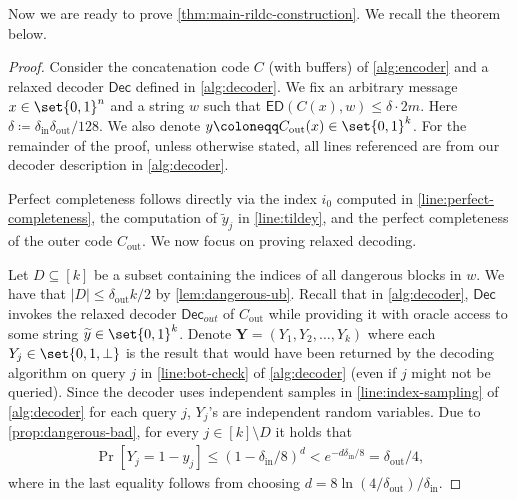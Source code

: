 \documentclass[10pt,a4paper]{article}
\theoremstyle{remark}
\newcommand{\tuple}[1]{\ensuremath{\left(#1\right)}}
\newcommand{\tp}{\tuple}
\newcommand{\Dec}{\ensuremath{\mathsf{Dec}}\xspace}
\newcommand{\ED}{\ensuremath{\mathsf{ED}}\xspace}%
\newcommand{\tildey}{\ensuremath{\widetilde{y}}\xspace}
\newcommand{\Cout}{C_{\text{out}}}
\newcommand{\dout}{\delta_{\text{out}}}
\newcommand{\din}{\delta_{\text{in}}}
\begin{document}
Now we are ready to prove \cref{thm:main-rildc-construction}. We recall the theorem below.
\weakirldcmain*
\begin{proof}
	Consider the concatenation code $C$ (with buffers) of \cref{alg:encoder} and a relaxed decoder $\Dec$ defined in \cref{alg:decoder}. 
	We fix an arbitrary message $x \in \set{0,1}^n$ and a string $w$ such that $\ED\tp{C(x), w}\le \delta \cdot 2m$. 
	Here $\delta \coloneqq \din\dout/128$. 
	We also denote $y \coloneqq \Cout(x) \in \set{0,1}^k$.
	For the remainder of the proof, unless otherwise stated, all lines referenced are from our decoder description in \cref{alg:decoder}.
	
	Perfect completeness follows directly via the index $i_0$ computed in \cref{line:perfect-completeness}, the computation of $\tildey_j$ in \cref{line:tildey}, and the perfect completeness of the outer code $\Cout$.
	We now focus on proving relaxed decoding.
	
	Let $D \subseteq [k]$ be a subset containing the indices of all dangerous blocks in $w$. We have that $|D|\le \dout k/2$ by \cref{lem:dangerous-ub}.
	Recall that in \cref{alg:decoder}, $\Dec$ invokes the relaxed decoder $\Dec_{out}$ of $\Cout$ while providing it with oracle access to some string $\widetilde{y} \in \set{0,1}^k$. 
	Denote $\mathbf{Y}=\tp{Y_1,Y_2,\dots,Y_k}$ where each $Y_j \in \set{0,1,\perp}$ is the result that would have been returned by the decoding algorithm on query $j$ in \cref{line:bot-check} of \cref{alg:decoder} (even if $j$ might not be queried). 
	Since the decoder uses independent samples in \cref{line:index-sampling} of \cref{alg:decoder} for each query $j$, $Y_j$'s are independent random variables. 
	Due to \cref{prop:dangerous-bad}, for every $j \in [k]\setminus D$ it holds that
	\begin{align*}
		\Pr\left[ Y_j = 1-y_j \right] \le (1-\din/8)^d < e^{-d\din/8} = \dout/4, 
	\end{align*}
	where in the last equality follows from choosing $d = 8\ln(4/\dout)/\din$.
	

\end{proof}
\end{document}
